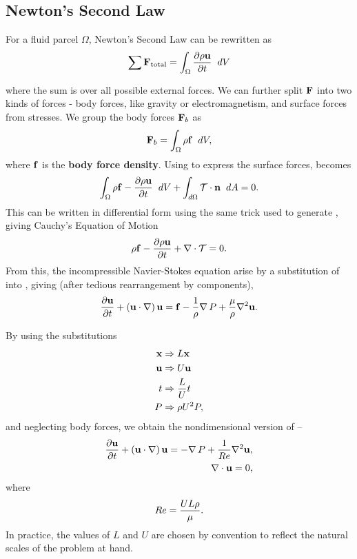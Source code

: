 \subsection{Newton's Second Law}
For a fluid parcel $\Omega$, Newton's Second Law can be rewritten as
\begin{equation}\label{eq:NSLInt}
\sum{}{}{\Vector{F}}_{\mathrm{total}} = \int{\Omega}{}{
							\pder{1}{\rho\Vector{u}}{t}}{dV}
\end{equation}
where the sum is over all possible external forces. We can further split $\mathbf{F}$ into two kinds of forces - body forces, like gravity or electromagnetism, and surface forces from stresses. We group the body forces $\mathbf{F}_b$ as \begin{equation}
\Vector{F}_b = \int{\Omega}{}{\rho\Vector{f}}{dV},
\end{equation}
where $\mathbf{f}$ is the {\bf body force density}. Using  to express the surface forces,  becomes
\begin{equation}
\int{\Omega}{}{\rho{\Vector{f}-\pder{1}{\rho\Vector{u}}{t}}}{dV} + \int{d\Omega}{}{\Tensor{T}\cdot\Vector{n}}{dA} = 0.
\end{equation}
This can be written in differential form using the same trick used to generate , giving Cauchy's Equation of Motion
\begin{equation}\label{eq:CauchyEOM}
\rho{\Vector{f}-\pder{1}{\rho\Vector{u}}{t} } + \Div{\Tensor{T}} = 0.
\end{equation}
From this, the incompressible Navier-Stokes equation arise by a substitution of  into , giving (after tedious rearrangement by components),
\begin{equation}\label{eq:NS}
\pder{1}{\Vector{u}}{t} + \paren{\Vector{u}\cdot\nabla}\Vector{u} = \Vector{f} - \frac{1}{\rho}\Grad{P} + \frac{\mu}{\rho}\nabla^2\Vector{u}.
\end{equation}

By using the substitutions
\begin{align}
\mathbf{x} &\Rightarrow L\mathbf{x}\\
\mathbf{u} &\Rightarrow U\mathbf{u}\\
t &\Rightarrow \dfrac{L}{U}t\\
P &\Rightarrow \rho U^2P,
\end{align}
and neglecting body forces, we obtain the nondimensional version of  --
\begin{align}
\pder{1}{\Vector{u}}{t} + \paren{\Vector{u}\cdot\nabla}\Vector{u} = -\Grad{P} + \frac{1}{\ReN}\nabla^2\Vector{u}\label{eq:NSND},\\
\nabla\cdot \Vector{u} = 0,
\end{align}
where \begin{equation}\label{eq:ReN}Re= \dfrac{UL\rho}{\mu}.\end{equation} In practice, the values of $L$ and $U$ are chosen by convention to reflect the natural scales of the problem at hand.
 
